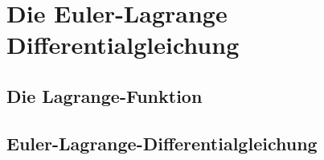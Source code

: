 %
%
%
\section{Die Euler-Lagrange Differentialgleichung
\label{buch:variation:section:eulerlagrange}}

%
%
\subsection{Die Lagrange-Funktion}

%
%
\subsection{Euler-Lagrange-Differentialgleichung}


